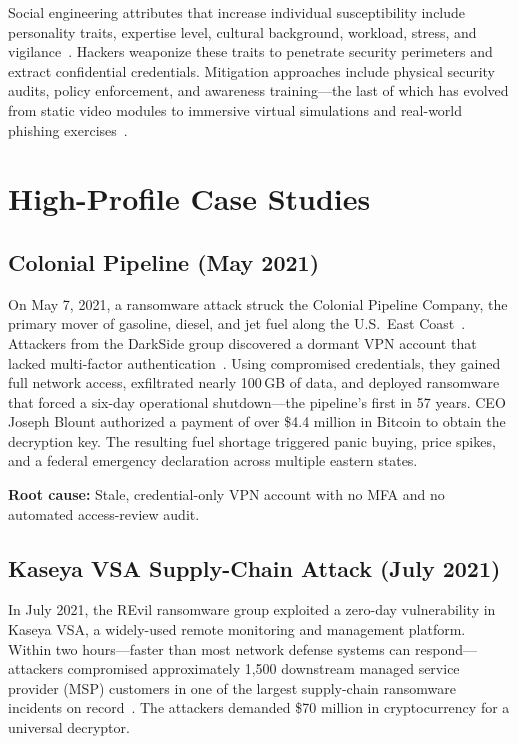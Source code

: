 \documentclass[sigconf,nonacm]{acmart}
\begin{document}
Social engineering attributes that increase individual susceptibility include
personality traits, expertise level, cultural background, workload, stress, and
vigilance~\cite{aldawood2019}. Hackers weaponize these traits to penetrate security
perimeters and extract confidential credentials. Mitigation approaches include physical
security audits, policy enforcement, and awareness training---the last of which has
evolved from static video modules to immersive virtual simulations and real-world
phishing exercises~\cite{kontio2016}.

\section{High-Profile Case Studies}

\subsection{Colonial Pipeline (May 2021)}

On May 7, 2021, a ransomware attack struck the Colonial Pipeline Company, the primary
mover of gasoline, diesel, and jet fuel along the U.S.\ East Coast~\cite{beerman2023}.
Attackers from the DarkSide group discovered a dormant VPN account that lacked
multi-factor authentication~\cite{kerner2022}. Using compromised credentials, they
gained full network access, exfiltrated nearly 100\,GB of data, and deployed ransomware
that forced a six-day operational shutdown---the pipeline's first in 57 years. CEO
Joseph Blount authorized a payment of over \$4.4 million in Bitcoin to obtain the
decryption key. The resulting fuel shortage triggered panic buying, price spikes, and
a federal emergency declaration across multiple eastern states.

\textbf{Root cause:} Stale, credential-only VPN account with no MFA and no automated
access-review audit.

\subsection{Kaseya VSA Supply-Chain Attack (July 2021)}

In July 2021, the REvil ransomware group exploited a zero-day vulnerability in Kaseya
VSA, a widely-used remote monitoring and management platform. Within two hours---faster
than most network defense systems can respond---attackers compromised approximately
1,500 downstream managed service provider (MSP) customers in one of the largest
supply-chain ransomware incidents on record~\cite{leo2022}. The attackers demanded
\$70 million in cryptocurrency for a universal decryptor.
\end{document}
